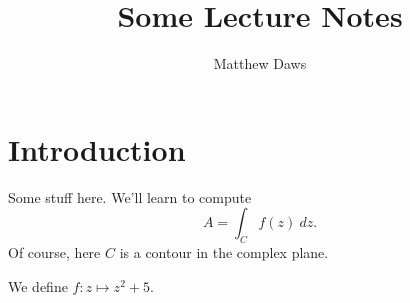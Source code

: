 \documentclass[a4paper,12pt]{article}
\begin{document}
\title{Some Lecture Notes}
\author{Matthew Daws}
\maketitle

\section{Introduction}

Some stuff here.  We'll learn to compute
\[ A = \int_C f(z) \ dz. \]
Of course, here $C$ is a contour in the complex plane.

We define $f: z\mapsto z^2+5$.
\end{document}
